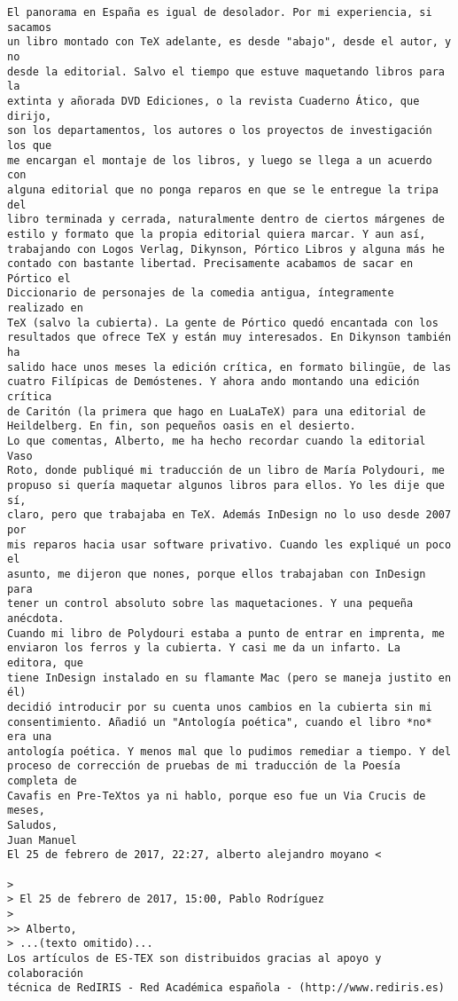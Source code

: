 \documentclass[a4paper,10pt]{article}
\begin{document}
\begin{lstlisting}
El panorama en España es igual de desolador. Por mi experiencia, si sacamos
un libro montado con TeX adelante, es desde "abajo", desde el autor, y no
desde la editorial. Salvo el tiempo que estuve maquetando libros para la
extinta y añorada DVD Ediciones, o la revista Cuaderno Ático, que dirijo,
son los departamentos, los autores o los proyectos de investigación los que
me encargan el montaje de los libros, y luego se llega a un acuerdo con
alguna editorial que no ponga reparos en que se le entregue la tripa del
libro terminada y cerrada, naturalmente dentro de ciertos márgenes de
estilo y formato que la propia editorial quiera marcar. Y aun así,
trabajando con Logos Verlag, Dikynson, Pórtico Libros y alguna más he
contado con bastante libertad. Precisamente acabamos de sacar en Pórtico el
Diccionario de personajes de la comedia antigua, íntegramente realizado en
TeX (salvo la cubierta). La gente de Pórtico quedó encantada con los
resultados que ofrece TeX y están muy interesados. En Dikynson también ha
salido hace unos meses la edición crítica, en formato bilingüe, de las
cuatro Filípicas de Demóstenes. Y ahora ando montando una edición crítica
de Caritón (la primera que hago en LuaLaTeX) para una editorial de
Heildelberg. En fin, son pequeños oasis en el desierto.
Lo que comentas, Alberto, me ha hecho recordar cuando la editorial Vaso
Roto, donde publiqué mi traducción de un libro de María Polydouri, me
propuso si quería maquetar algunos libros para ellos. Yo les dije que sí,
claro, pero que trabajaba en TeX. Además InDesign no lo uso desde 2007 por
mis reparos hacia usar software privativo. Cuando les expliqué un poco el
asunto, me dijeron que nones, porque ellos trabajaban con InDesign para
tener un control absoluto sobre las maquetaciones. Y una pequeña anécdota.
Cuando mi libro de Polydouri estaba a punto de entrar en imprenta, me
enviaron los ferros y la cubierta. Y casi me da un infarto. La editora, que
tiene InDesign instalado en su flamante Mac (pero se maneja justito en él)
decidió introducir por su cuenta unos cambios en la cubierta sin mi
consentimiento. Añadió un "Antología poética", cuando el libro *no* era una
antología poética. Y menos mal que lo pudimos remediar a tiempo. Y del
proceso de corrección de pruebas de mi traducción de la Poesía completa de
Cavafis en Pre-TeXtos ya ni hablo, porque eso fue un Via Crucis de meses,
Saludos,
Juan Manuel
El 25 de febrero de 2017, 22:27, alberto alejandro moyano <

>
> El 25 de febrero de 2017, 15:00, Pablo Rodríguez 
>
>> Alberto,
> ...(texto omitido)...
Los artículos de ES-TEX son distribuidos gracias al apoyo y colaboración 
técnica de RedIRIS - Red Académica española - (http://www.rediris.es)

\end{lstlisting}
\end{document}
